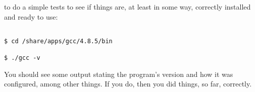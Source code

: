 \documentclass[]{article}
\begin{document}
                                                                                                                                                                                                                       to do a simple tests to see if things are, at least in some way, correctly installed and ready to use:
                                                                                                                                                                                                                       \begin{lstlisting}
                                                                                                                                                                                                                       $ cd /share/apps/gcc/4.8.5/bin
                                                                                                                                                                                                                       $ ./gcc -v
                                                                                                                                                                                                                       \end{lstlisting}
                                                                                                                                                                                                                       You should see some output stating the program's version and how it was configured, among other things. If you do, then you did things,
                                                                                                                                                                                                                       so far, correctly.
\end{document}

